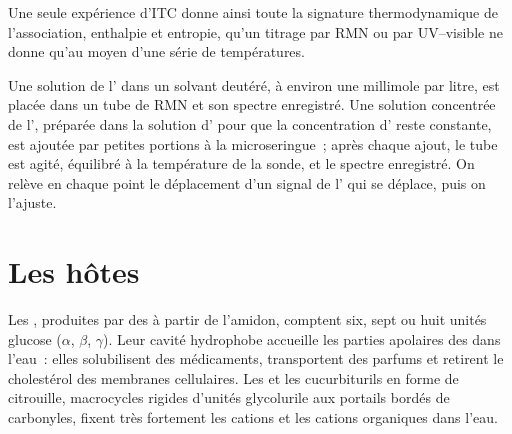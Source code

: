 Une seule expérience d'ITC donne ainsi toute la signature thermodynamique
de l'association, enthalpie et entropie, qu'un titrage par RMN ou par
UV--visible ne donne qu'au moyen d'une série de températures.

\begin{inthelab}
Une solution de l' dans un solvant deutéré, à environ une millimole par
litre, est placée dans un tube de RMN et son spectre enregistré. Une
solution concentrée de l', préparée dans la solution d' pour que
la concentration d' reste constante, est ajoutée par petites portions à
la microseringue~; après chaque ajout, le tube est agité, équilibré à la
température de la sonde, et le spectre enregistré. On relève en chaque
point le déplacement d'un signal de l' qui se déplace, puis on
l'ajuste.
\end{inthelab}

\section{Les hôtes}

Les , produites par des  à partir de l'amidon,
comptent six, sept ou huit unités glucose ($\alpha$, $\beta$, $\gamma$). Leur cavité hydrophobe
accueille les parties apolaires des  dans l'eau~: elles
solubilisent des médicaments, transportent des parfums et retirent le
cholestérol des membranes cellulaires. Les  et les
cucurbiturils en forme de citrouille, macrocycles rigides d'unités
glycolurile aux portails bordés de carbonyles, fixent très fortement les
cations et les cations organiques dans l'eau.

